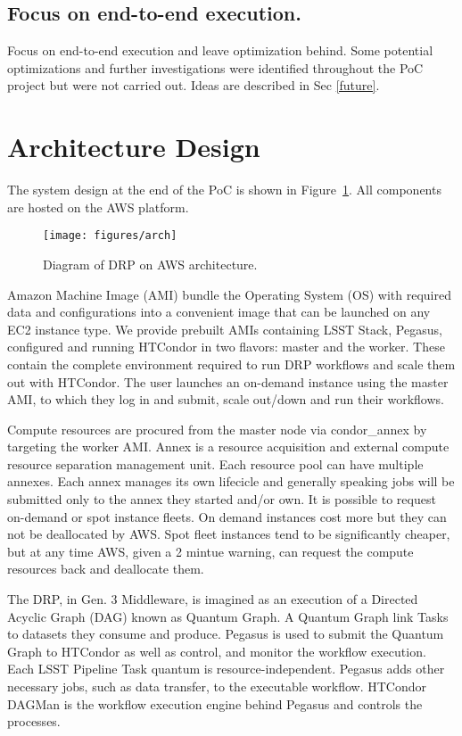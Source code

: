 \subsection{Focus on end-to-end execution.}

Focus on end-to-end execution and leave optimization behind.
Some potential optimizations and further investigations were identified throughout the PoC project but were not carried out.
Ideas are described in Sec \ref{future}.


\section{Architecture Design}

The system design at the end of the PoC is shown in Figure~\ref{fig:arch}.
All components are hosted on the AWS platform.

\begin{figure}
  \centering
  \texttt{[image: figures/arch]}
  \label{fig:arch}
  \caption{Diagram of DRP on AWS architecture.}
\end{figure}

Amazon Machine Image (AMI) bundle the Operating System (OS) with required data and configurations into a convenient image that can be launched on any EC2 instance type. We provide prebuilt AMIs containing LSST Stack, Pegasus, configured and running HTCondor in two flavors: master and the worker. These contain the complete environment required to run DRP workflows and scale them out with HTCondor. The user launches an on-demand instance using the master AMI, to which they log in and submit, scale out/down and run their workflows. 

Compute resources are procured from the master node via condor\_annex by targeting the worker AMI. Annex is a resource acquisition and external compute resource separation management unit. Each resource pool can have multiple annexes. Each annex manages its own lifecicle and generally speaking jobs will be submitted only to the annex they started and/or own. It is possible to request on-demand or spot instance fleets. On demand instances cost more but they can not be deallocated by AWS. Spot fleet instances tend to be significantly cheaper, but at any time AWS, given a 2 mintue warning, can request the compute resources back and deallocate them. 

The DRP, in Gen. 3 Middleware, is imagined as an execution of a Directed Acyclic Graph (DAG) known as Quantum Graph. A Quantum Graph link Tasks to datasets they consume and produce. Pegasus is used to submit the Quantum Graph to HTCondor as well as control, and monitor the workflow execution. Each LSST Pipeline Task quantum is resource-independent. Pegasus adds other necessary jobs, such as data transfer, to the executable workflow. HTCondor DAGMan is the workflow execution engine behind Pegasus and controls the processes.

